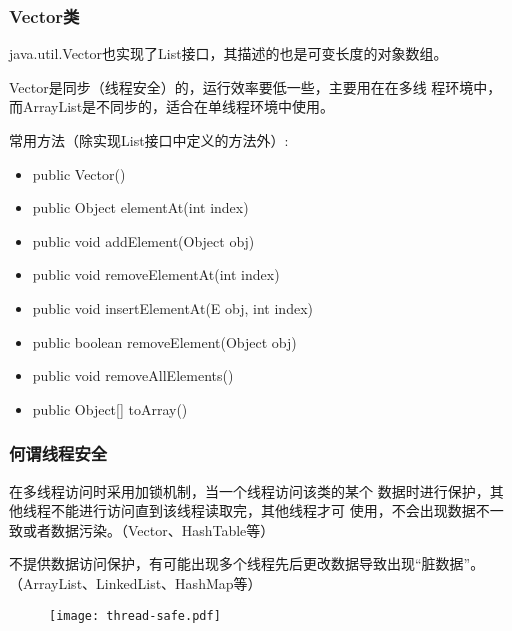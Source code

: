 \begin{frame}[fragile] %
  \frametitle{Vector类}

  java.util.Vector也实现了List接口，其描述的也是可变长度的对象数组。


  {\Red\kai Vector是同步（线程安全）的，运行效率要低一些，主要用在在多线
    程环境中，而ArrayList是不同步的，适合在单线程环境中使用。}

  常用方法（除实现List接口中定义的方法外）:

  \begin{itemize}\small
  \item public Vector()
  \item public Object elementAt(int index)
  \item public void addElement(Object obj)
  \item public void removeElementAt(int index)
  \item public void insertElementAt(E obj, int index) 
  \item public boolean removeElement(Object obj) 
  \item public void removeAllElements()
  \item public Object[] toArray()
  \end{itemize}
\end{frame}

\begin{frame}[fragile]
  \frametitle{何谓线程安全}


  \begin{description}\kai\small
  \item[线程安全] 在多线程访问时采用加锁机制，当一个线程访问该类的某个
    数据时进行保护，其他线程不能进行访问直到该线程读取完，其他线程才可
    使用，不会出现数据不一致或者数据污染。（Vector、HashTable等）
  \item[线程不安全] 不提供数据访问保护，有可能出现多个线程先后更改数据导致出现“脏数据”。
    （ArrayList、LinkedList、HashMap等）
  \end{description}

  \begin{figure}
    \centering
    \texttt{[image: thread-safe.pdf]}
  \end{figure}

\end{frame}

